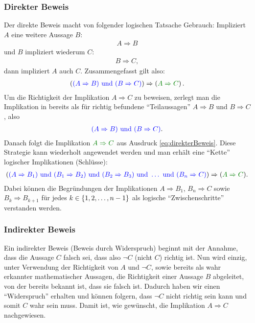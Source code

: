 \subsubsection{Direkter Beweis}
Der direkte Beweis macht von folgender logischen Tatsache Gebrauch: Impliziert $A$ eine weitere Aussage $B$:
\begin{align*}
    A \Rightarrow B
\end{align*}
und $B$ impliziert wiederum $C$:
\begin{align*}
    B \Rightarrow C,
\end{align*}
dann impliziert $A$ auch $C$. Zusammengefasst gilt also:
\begin{align}\label{eq:direkterBeweis}
     \lr{\textcolor{Blue}{(A\Rightarrow B) \text{ und } (B\Rightarrow C)}} \Rightarrow \lr{\textcolor{Green}{A\Rightarrow C}}.
\end{align}
Um die Richtigkeit der Implikation $A\Rightarrow C$ zu beweisen, zerlegt man die Implikation in bereits als für richtig befundene \enquote{Teilaussagen} $A\Rightarrow B$ und $B\Rightarrow C$, also
\begin{align*}
    \textcolor{Blue}{(A\Rightarrow B) \text{ und } (B\Rightarrow C)}.
\end{align*}
Danach folgt die Implikation $\textcolor{Green}{A\Rightarrow C}$ aus Ausdruck \ref{eq:direkterBeweis}. Diese Strategie kann wiederholt angewendet werden und man erhält eine \enquote{Kette} logischer Implikationen (Schlüsse):
\begin{align*}
    \lr{ \textcolor{Blue}{(A\Rightarrow B_1) \text{ und } (B_1\Rightarrow B_2) \text{ und } (B_2\Rightarrow B_3) \text{ und } \ldots \text{ und } (B_n\Rightarrow C)} } \Rightarrow (\textcolor{Green}{A\Rightarrow C}).
\end{align*}
Dabei können die Begründungen der Implikationen $A\Rightarrow B_1$, $B_n\Rightarrow C$ sowie $B_k\Rightarrow B_{k+1}$ für jedes $k\in\left\{1,2,\ldots, n-1\right\}$ als logische \enquote{Zwischenschritte} verstanden werden.

\subsubsection{Indirekter Beweis}
Ein indirekter Beweis (Beweis durch Widerspruch) beginnt mit der Annahme, dass die Aussage $C$ falsch sei, dass also $\neg{C}$ (nicht $C$) richtig ist. Nun wird einzig, unter Verwendung der Richtigkeit von $A$ und $\neg{C}$, sowie bereits als wahr erkannter mathematischer Aussagen, die Richtigkeit einer Aussage $B$ abgeleitet, von der bereits bekannt ist, dass sie falsch ist. Dadurch haben wir einen \enquote{Widerspruch} erhalten und können folgern, dass $\neg{C}$ nicht richtig sein kann und somit $C$ wahr sein muss. Damit ist, wie gewünscht, die Implikation $A\Rightarrow C$ nachgewiesen.

